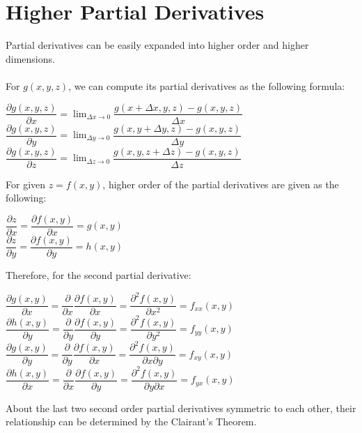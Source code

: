 \documentclass[UTF8,a4paper, 10pt, openany]{book}
\begin{document}
\section{Higher Partial Derivatives}
Partial derivatives can be easily expanded into higher order and higher dimensions.\\ \\
For $g(x,y,z)$, we can compute its partial derivatives as the following formula:
\begin{center}
$\dfrac{\partial g(x,y,z)}{\partial x}=\displaystyle\lim_{\Delta x\to 0} \dfrac{g(x+\Delta x,y,z)-g(x,y,z)}{\Delta x}$\\
$\dfrac{\partial g(x,y,z)}{\partial y}=\displaystyle\lim_{\Delta y\to 0} \dfrac{g(x,y+\Delta y,z)-g(x,y,z)}{\Delta y}$\\
$\dfrac{\partial g(x,y,z)}{\partial z}=\displaystyle\lim_{\Delta z\to 0} \dfrac{g(x,y,z+\Delta z)-g(x,y,z)}{\Delta z}$
\end{center}
For given $z=f(x,y)$, higher order of the partial derivatives are given as the following:
\begin{center}
$\dfrac{\partial z}{\partial x}=\dfrac{\partial f(x,y)}{\partial x}=g(x,y)$\\
$\dfrac{\partial z}{\partial y}=\dfrac{\partial f(x,y)}{\partial y}=h(x,y)$
\end{center}
Therefore, for the second partial derivative:
\begin{center}
$\dfrac{\partial g(x,y)}{\partial x}=\dfrac{\partial}{\partial x}\dfrac{\partial f(x,y)}{\partial x}=\dfrac{\partial^2 f(x,y)}{\partial x^2}=f_{xx}(x,y)$\\
$\dfrac{\partial h(x,y)}{\partial y}=\dfrac{\partial}{\partial y}\dfrac{\partial f(x,y)}{\partial y}=\dfrac{\partial^2 f(x,y)}{\partial y^2}=f_{yy}(x,y)$\\
$\dfrac{\partial g(x,y)}{\partial y}=\dfrac{\partial}{\partial y}\dfrac{\partial f(x,y)}{\partial x}=\dfrac{\partial^2 f(x,y)}{\partial x\partial y}=f_{xy}(x,y)$\\
$\dfrac{\partial h(x,y)}{\partial x}=\dfrac{\partial}{\partial x}\dfrac{\partial f(x,y)}{\partial y}=\dfrac{\partial^2 f(x,y)}{\partial y\partial x}=f_{yx}(x,y)$
\end{center}
About the last two second order partial derivatives symmetric to each other, their relationship can be determined by the Clairant's Theorem.
\end{document}
